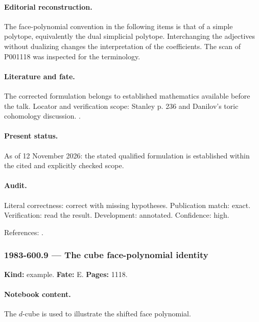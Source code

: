 \paragraph{Editorial reconstruction.} The face-polynomial convention in the following items is that of a simple polytope, equivalently the dual simplicial polytope. Interchanging the adjectives without dualizing changes the interpretation of the coefficients. The scan of P001118 was inspected for the terminology.

\paragraph{Literature and fate.} The corrected formulation belongs to established mathematics available before the talk. Locator and verification scope: Stanley p. 236 and Danilov's toric cohomology discussion. \cite{stanley1980faces,danilov1978toric}.

\paragraph{Present status.} As of 12 November 2026: the stated qualified formulation is established within the cited and explicitly checked scope.

\paragraph{Audit.} Literal correctness: correct with missing hypotheses. Publication match: exact. Verification: read the result. Development: annotated. Confidence: high.

\noindent References: \citep{stanley1980faces,danilov1978toric}.\par

\subsubsection{1983-600.9 --- The cube face-polynomial identity}

\label{item:1983-600.9}

\noindent\textbf{Kind:} example. \textbf{Fate:} E. \textbf{Pages:} 1118.\par

\paragraph{Notebook content.} The \(d\)-cube is used to illustrate the shifted face polynomial.

